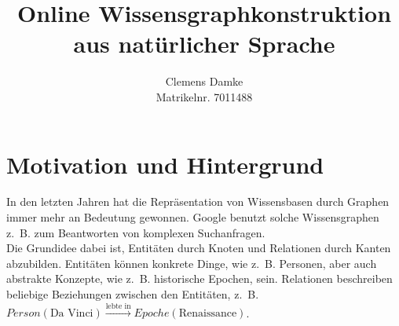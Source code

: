 \documentclass[11pt, a4paper]{scrreprt}
\begin{document}
\frontmatter
\titlehead{Entwurf 1}
\subject{Bachelorarbeit Proposal}
\title{
	Online Wissensgraphkonstruktion\\
	aus natürlicher Sprache
}
\author{
	Clemens Damke\\[1ex]
	Matrikelnr. 7011488
}
\publishers{
	{\normalsize betreut von}\\[2ex]
	Prof.~Dr.~Eyke Hüllermeier\\
	Intelligente Systeme\\
	Institut für Informatik\\
	Universität Paderborn
}
\maketitle

\section{Motivation und Hintergrund}

In den letzten Jahren hat die Repräsentation von Wissensbasen durch Graphen immer mehr an Bedeutung gewonnen.
Google benutzt solche Wissensgraphen z.~B. zum Beantworten von komplexen Suchanfragen.\\

Die Grundidee dabei ist, Entitäten durch Knoten und Relationen durch Kanten abzubilden.
Entitäten können konkrete Dinge, wie z.~B. Personen, aber auch abstrakte Konzepte, wie z.~B. historische Epochen, sein.
Relationen beschreiben beliebige Beziehungen zwischen den Entitäten, z.~B. $Person(\text{Da~Vinci}) \xrightarrow{\text{lebte~in}} Epoche(\text{Renaissance})$.\\
\end{document}
